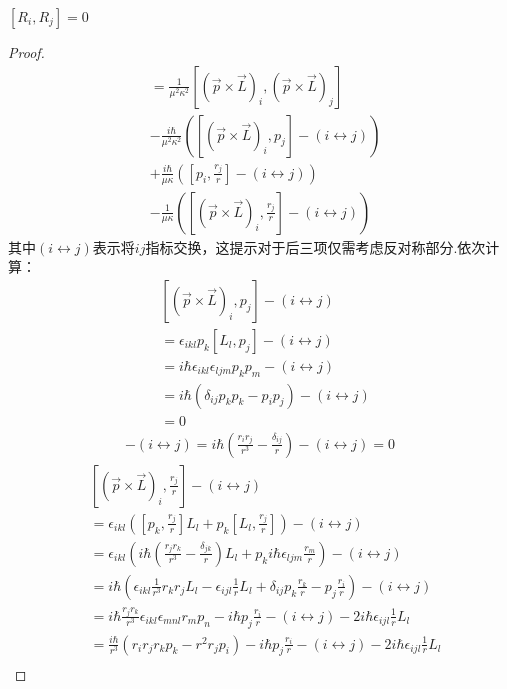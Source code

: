 \begin{theorem}
$[R_i, R_j] = 0$
\end{theorem}
\begin{proof}
\begin{align*}
[R_i, R_j] &= \frac{1}{\mu^2\kappa^2}[(\vec p \times \vec L)_i,(\vec p \times \vec L)_j] \\
&- \frac{i\hbar}{\mu^2\kappa^2} ([(\vec p \times \vec L)_i, p_j] - (i \leftrightarrow j))\\
&+ \frac{i\hbar}{\mu\kappa} ([p_i, \frac{r_j}{r}] - (i \leftrightarrow j))\\
&- \frac{1}{\mu\kappa} ([(\vec p \times \vec L)_i, \frac{r_j}{r}] - (i \leftrightarrow j))
\end{align*}
其中$(i \leftrightarrow j)$表示将$ij$指标交换，这提示对于后三项仅需考虑反对称部分.依次计算：
\begin{align*}
   & [(\vec p \times \vec L)_i, p_j] - (i \leftrightarrow j)\\
&= \epsilon_{ikl} p_k [L_l, p_j] - (i \leftrightarrow j)\\
&= i\hbar\epsilon_{ikl}\epsilon_{ljm} p_k p_m - (i \leftrightarrow j)\\
&= i\hbar(\delta_{ij} p_k p_k - p_i p_j) - (i \leftrightarrow j)\\
&= 0
\end{align*}
\begin{align*}
    [p_i, \frac{r_j}{r}] -(i \leftrightarrow j) = i\hbar\left(\frac{r_i r_j}{r^3} - \frac{\delta_{ij}}{r}\right) -(i \leftrightarrow j) = 0
\end{align*}
\begin{align*}
   & [(\vec p \times \vec L)_i, \frac{r_j}{r}] - (i \leftrightarrow j)\\
&= \epsilon_{ikl} \left([p_k, \frac{r_j}{r}]L_l + p_k[L_l, \frac{r_j}{r}]\right) - (i \leftrightarrow j)\\
&=\epsilon_{ikl} \left(i\hbar \left(\frac{r_j r_k}{r^3} - \frac{\delta_{jk}}{r}\right)L_l + p_k i\hbar \epsilon_{ljm}\frac{r_m}{r}\right) - (i \leftrightarrow j) \\
&= i\hbar\left(\epsilon_{ikl}\frac{1}{r^3}r_k r_j L_l - \epsilon_{ijl}\frac{1}{r}L_l + \delta_{ij}p_k \frac{r_k}{r} - p_j \frac{r_i}{r}\right) - (i \leftrightarrow j) \\
&= i\hbar \frac{r_j r_k}{r^3}\epsilon_{ikl}\epsilon_{mnl}r_m p_n - i\hbar p_j\frac{r_i}{r} - (i \leftrightarrow j) - 2i\hbar \epsilon_{ijl}\frac{1}{r}L_l\\
&= \frac{i\hbar}{r^3} (r_i r_j r_k p_k - r^2 r_j p_i)- i\hbar p_j\frac{r_i}{r} - (i \leftrightarrow j) - 2i\hbar \epsilon_{ijl}\frac{1}{r}L_l\\

\end{align*}
\end{proof}
